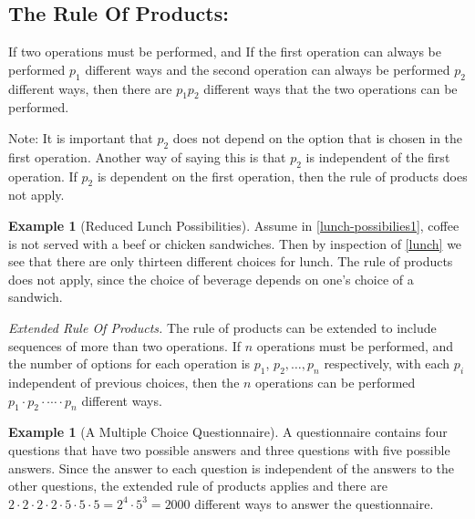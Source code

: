 \documentclass[10pt,]{book}
\theoremstyle{plain}
\theoremstyle{definition}
\newtheorem{example}[theorem]{Example}
\begin{document}
\subsection[The Rule Of Products:]{The Rule Of Products:}\label{rule-of-products}
If two operations must be performed, and If the first operation can always be performed \(p_1\) different ways and the second operation can always be performed \(p_2\) different ways, then there are \(p_1 p_2\) different ways that the two operations can be performed.
%
\par

Note: It is important that \(p_2\) does not depend on the option that is chosen in the first operation. Another way of saying this is that \(p_2\) is independent of the first operation. If \(p_2\) is dependent on the first operation, then the rule of products does not apply.
%
\begin{example}[Reduced Lunch Possibilities]\label{lunch-possibilites2}
Assume in \hyperref[lunch-possibilies1]{\ref{lunch-possibilies1}}, coffee is not served with a beef or chicken sandwiches. Then by inspection of \hyperref[lunch]{\ref{lunch}} we see that there are only thirteen different choices for lunch. The rule of products does not apply, since the choice of beverage depends on one's choice of a sandwich.%
\end{example}
\par
\emph{Extended Rule Of Products.} The rule of products can be extended to include sequences of more than two operations. If \(n\) operations must be performed, and the number of options for each operation is \(p_1\), \(p_2, \dots, p_n\) respectively, with each \(p_i\)  independent of previous choices, then the \(n\) operations can be performed \(p_1 \cdot p_2 \cdot \cdots \cdot p_n\) different ways.
%
\begin{example}[A Multiple Choice Questionnaire]\label{another_questionnaire}
A questionnaire contains four questions that have two possible answers and three questions with five possible answers. Since the answer to each question is independent of the answers to the other questions, the extended rule of products applies and there are
\(2 \cdot 2 \cdot 2 \cdot 2 \cdot 5 \cdot 5 \cdot 5 = 2^4 \cdot 5^3 = 2000 \) different ways to answer the questionnaire.%
\end{example}
\par
\end{document}
